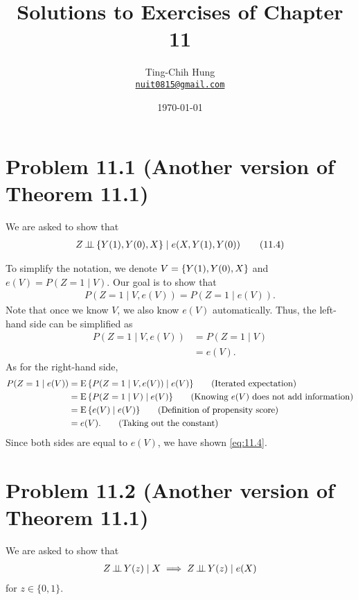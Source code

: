 \documentclass[10pt]{article}
\title{Solutions to Exercises of Chapter 11}
\author{Ting-Chih Hung \\ \href{mailto:nuit0815@gmail.com}{\texttt{nuit0815@gmail.com}}}
\date{\today}
\begin{document}
\maketitle

\section*{Problem 11.1 (Another version of Theorem 11.1)}

We are asked to show that
\begin{align}
  Z \operatorname{\perp\!\!\!\perp} {\left\lbrace Y(1), Y(0), X \right\rbrace} \mid e(X, Y(1), Y(0)) \label{eq:11.4} \tag{11.4}
\end{align}

To simplify the notation,
we denote $V = {\left\lbrace Y(1), Y(0), X \right\rbrace}$ and $e(V) = P(Z = 1 \mid V)$.
Our goal is to show that
\begin{align*}
  P(Z = 1 \mid V, e(V)) = P(Z = 1 \mid e(V)).
\end{align*}
Note that once we know $V$,
we also know $e(V)$ automatically.
Thus, the left-hand side can be simplified as
\begin{align*}
  P(Z = 1 \mid V, e(V)) 
  &= P(Z = 1 \mid V) \tag{Knowing $e(V)$ does not add information} \\
  &= e(V). \tag{Definition of propensity score}
\end{align*}
As for the right-hand side,
\begin{align*}
  P(Z = 1 \mid e(V))
  &= \operatorname{E}{\left\lbrace P(Z = 1 \mid V, e(V)) \mid e(V) \right\rbrace} \tag{Iterated expectation} \\
  &= \operatorname{E}{\left\lbrace P(Z = 1 \mid V) \mid e(V) \right\rbrace} \tag{Knowing $e(V)$ does not add information} \\
  &= \operatorname{E}{\left\lbrace e(V) \mid e(V) \right\rbrace} \tag{Definition of propensity score} \\
  &= e(V). \tag{Taking out the constant}
\end{align*}
Since both sides are equal to $e(V)$,
we have shown \eqref{eq:11.4}.

\section*{Problem 11.2 (Another version of Theorem 11.1)}

We are asked to show that
\begin{align*}
  Z \operatorname{\perp\!\!\!\perp} Y(z) \mid X \implies Z \operatorname{\perp\!\!\!\perp} Y(z) \mid e(X)
\end{align*}
for $z \in \{0, 1\}$.
\end{document}
